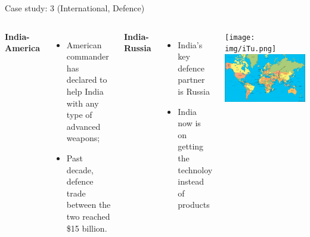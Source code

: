 \begin{frame}{Case study: 3 (International, Defence)}
\begin{columns}
\textbf{India-America}
\begin{itemize}
	\item American commander has declared to help India with any type of advanced weapons;
	\item Past decade, defence trade between the two reached \$15 billion.
\end{itemize}
\textbf{India-Russia}
\begin{itemize}
	\item India's key defence partner is Russia
	\item India now is on getting the technoloy instead of products
\end{itemize}
\texttt{[image: img/iTu.png]}\\
\includegraphics[width=\textwidth]{img/iTr.png}
\end{columns}
\end{frame}
